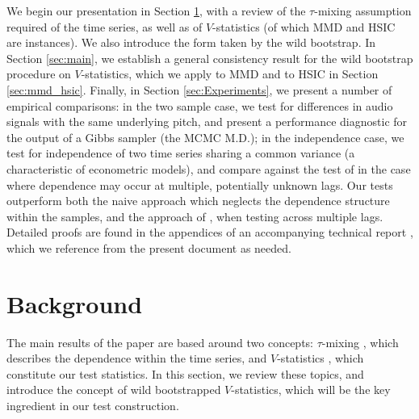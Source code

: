

We begin our presentation in Section \ref{sec:background}, with a review of the $\tau$-mixing assumption required of the time series, as well as of   $V$-statistics (of which MMD and HSIC are instances). We also introduce the form taken by the wild bootstrap. In Section \ref{sec:main}, we establish a general consistency result for the wild bootstrap procedure on $V$-statistics, which we apply to MMD and to HSIC in Section \ref{sec:mmd_hsic}. Finally, in Section \ref{sec:Experiments}, we present a number of empirical comparisons: in the two sample case, we test for differences in audio signals with the same underlying pitch, and present a performance diagnostic for the output of a Gibbs sampler (the MCMC M.D.); in the independence case, we test for independence of two time series sharing a common variance (a characteristic of econometric models), and compare against the test of \cite{besserve_statistical_2013} in the case where dependence may occur at multiple, potentially unknown lags. Our tests outperform both the naive approach which neglects the dependence structure within the samples, and the approach of \cite{besserve_statistical_2013}, when testing across multiple lags. Detailed proofs are found in the appendices of an accompanying technical report \cite{chwialkowski2014wild}, which we reference from the present document as needed.

\section{Background}\label{sec:background}
The main results of the paper are based around two concepts: $\tau$-mixing \cite{dedecker2007weak}, which describes the dependence within the time series, and  $V$-statistics \cite{serfling80}, which constitute our test statistics. In this section, we review these topics, and introduce the concept of wild bootstrapped $V$-statistics, which will be the key ingredient in our test construction.
